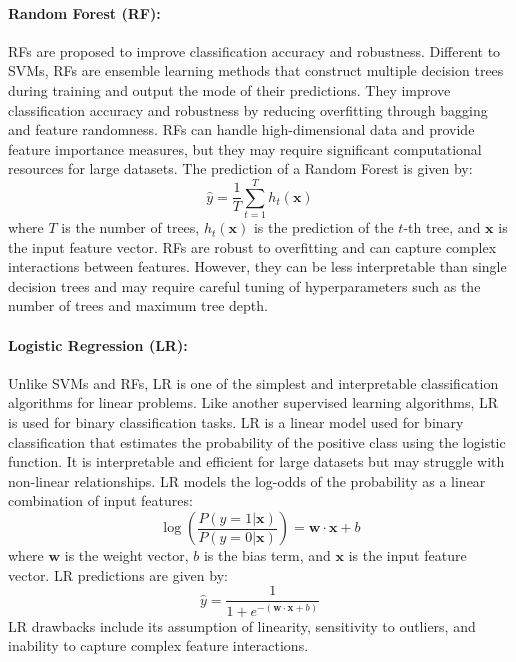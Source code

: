\documentclass[12pt, a4paper]{article}
\begin{document}
\paragraph{Random Forest (RF)\cite{breiman2001random}:} RFs are proposed to improve classification accuracy and robustness. Different to SVMs, RFs are ensemble learning methods that construct multiple decision trees during training and output the mode of their predictions. They improve classification accuracy and robustness by reducing overfitting through bagging and feature randomness. RFs can handle high-dimensional data and provide feature importance measures, but they may require significant computational resources for large datasets. The prediction of a Random Forest is given by:
\begin{equation}
\hat{y} = \frac{1}{T} \sum_{t=1}^{T} h_t(\mathbf{x})
\end{equation}
where $T$ is the number of trees, $h_t(\mathbf{x})$ is the prediction of the $t$-th tree, and $\mathbf{x}$ is the input feature vector. RFs are robust to overfitting and can capture complex interactions between features. However, they can be less interpretable than single decision trees and may require careful tuning of hyperparameters such as the number of trees and maximum tree depth. 


\paragraph{Logistic Regression (LR)\cite{hosmer2013applied}:} Unlike SVMs and RFs, LR is one of the simplest and interpretable classification algorithms for linear problems. Like another supervised learning algorithms, LR is used for binary classification tasks. LR is a linear model used for binary classification that estimates the probability of the positive class using the logistic function. It is interpretable and efficient for large datasets but may struggle with non-linear relationships. LR models the log-odds of the probability as a linear combination of input features:
\begin{equation}
\log\left(\frac{P(y=1|\mathbf{x})}{P(y=0|\mathbf{x})}\right) = \mathbf{w} \cdot \mathbf{x} + b
\end{equation}
where $\mathbf{w}$ is the weight vector, $b$ is the bias term, and $\mathbf{x}$ is the input feature vector. LR predictions are given by:
\begin{equation}
\hat{y} = \frac{1}{1 + e^{-(\mathbf{w} \cdot \mathbf{x} + b)}}
\end{equation}
LR drawbacks include its assumption of linearity, sensitivity to outliers, and inability to capture complex feature interactions. 
\end{document}
